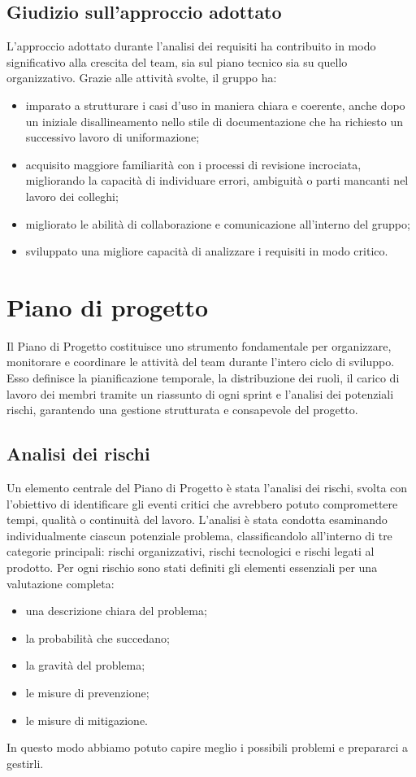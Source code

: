 \documentclass[11pt,a4paper]{article}
\begin{document}
\subsection{Giudizio sull'approccio adottato}
L’approccio adottato durante l’analisi dei requisiti ha contribuito in modo significativo alla crescita del team, sia sul piano tecnico sia su quello organizzativo. Grazie alle attività svolte, il gruppo ha:
\begin{itemize}
\item imparato a strutturare i casi d’uso in maniera chiara e coerente, anche dopo un iniziale disallineamento nello stile di documentazione che ha richiesto un successivo lavoro di uniformazione;
\item acquisito maggiore familiarità con i processi di revisione incrociata, migliorando la capacità di individuare errori, ambiguità o parti mancanti nel lavoro dei colleghi;
\item migliorato le abilità di collaborazione e comunicazione all'interno del gruppo;
\item sviluppato una migliore capacità di analizzare i requisiti in modo critico.
\end{itemize}

\newpage

\section{Piano di progetto}
Il Piano di Progetto costituisce uno strumento fondamentale per organizzare, monitorare e coordinare le attività del team durante l’intero ciclo di sviluppo. Esso definisce la pianificazione temporale, la distribuzione dei ruoli, il carico di lavoro dei membri tramite un riassunto di ogni sprint e l’analisi dei potenziali rischi, garantendo una gestione strutturata e consapevole del progetto.

\subsection{Analisi dei rischi}
Un elemento centrale del Piano di Progetto è stata l’analisi dei rischi, svolta con l’obiettivo di identificare gli eventi critici che avrebbero potuto compromettere tempi, qualità o continuità del lavoro.
L’analisi è stata condotta esaminando individualmente ciascun potenziale problema, classificandolo all’interno di tre categorie principali: rischi organizzativi, rischi tecnologici e rischi legati al prodotto.
Per ogni rischio sono stati definiti gli elementi essenziali per una valutazione completa:
\begin{itemize}
\item una descrizione chiara del problema;
\item la probabilità che succedano;
\item la gravità del problema;
\item le misure di prevenzione;
\item le misure di mitigazione.
\end{itemize}
In questo modo abbiamo potuto capire meglio i possibili problemi e prepararci a gestirli.
\end{document}

